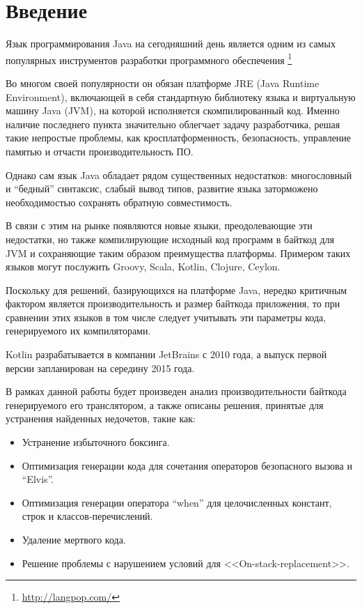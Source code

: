 \clearpage
\section*{Введение}

Язык программирования Java на сегодняшний день является одним из самых популярных инструментов
разработки программного обеспечения \footnote{\url{http://langpop.com/}}

Во многом своей популярности он обязан платформе JRE (Java Runtime Environment), включающей в себя
стандартную библиотеку языка и виртуальную машину Java (JVM), на которой исполняется скомпилированный код.
Именно наличие последнего пункта значительно облегчает задачу разработчика, решая такие непростые
проблемы,  как кросплатформенность, безопасность, управление памятью и отчасти производительность ПО.

Однако сам язык Java обладает рядом существенных недостатков: многословный и ``бедный'' синтаксис,
слабый вывод типов, развитие языка заторможено необходимостью сохранять обратную совместимость.

В связи с этим на рынке появляются новые языки, преодолевающие эти недостатки, но также
компилирующие исходный код программ в байткод для JVM и сохраняющие таким образом преимущества платформы.
Примером таких языков могут послужить Groovy, Scala, Kotlin, Clojure, Ceylon.

Поскольку для решений, базирующихся на платформе Java, нередко критичным фактором является
производительность и размер байткода приложения, то при сравнении этих языков в том числе следует
учитывать эти параметры кода, генерируемого их компиляторами.

Kotlin разрабатывается в компании JetBrains с 2010 года, а выпуск первой версии запланирован на середину 2015 года.

В рамках данной работы будет произведен анализ производительности байткода генерируемого его транслятором,
а также описаны решения, принятые для устранения найденных недочетов, такие как:
\begin{itemize}
    \item Устранение избыточного боксинга.
    \item Оптимизация генерации кода для сочетания операторов безопасного вызова и ``Elvis''.
    \item Оптимизация генерации оператора ``when'' для целочисленных констант, строк и классов-перечислений.
    \item Удаление мертвого кода.
    \item Решение проблемы с нарушением условий для <<On-stack-replacement>>.
\end{itemize}

